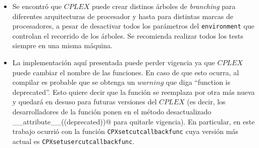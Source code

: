 \begin{itemize}
\item Se encontró que $CPLEX$ puede crear distinos árboles de \emph{branching} para diferentes arquitecturas de procesador y hasta para distintas marcas de procesadores, a pesar de desactivar todos los parámetros del \verb_environment_ que controlan el recorrido de los árboles. Se recomienda realizar todos los tests siempre en una misma máquina.


\item La implementación aquí presentada puede perder vigencia ya que $CPLEX$ puede cambiar el nombre de las funciones. En caso de que esto ocurra, al compilar es probable que se obtenga un $warning$ que diga ``function is deprecated''. Esto quiere decir que la función se reemplaza por otra más nueva y quedará en desuso para futuras versiones del $CPLEX$ (es decir, los desarrolladores de la función ponen en el método desactualizado \verb@__attribute__((deprecated))@ para quitarle vigencia). En particular, en este trabajo ocurrió con la función \verb_CPXsetcutcallbackfunc_ cuya versión más actual es \verb_CPXsetusercutcallbackfunc_.

\end{itemize}
